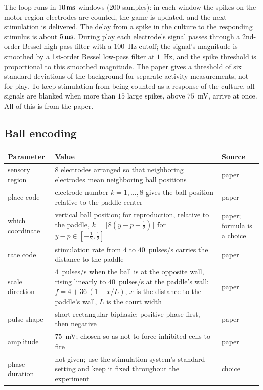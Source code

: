 The loop runs in $10\,\text{ms}$ windows ($200$ samples): in each window the spikes on the motor-region electrodes are counted, the game is updated, and the next stimulation is delivered. The delay from a spike in the culture to the responding stimulus is about $5\,\text{ms}$. During play each electrode's signal passes through a 2nd-order Bessel high-pass filter with a $100$~Hz cutoff; the signal's magnitude is smoothed by a 1st-order Bessel low-pass filter at $1$~Hz, and the spike threshold is proportional to this smoothed magnitude. The paper gives a threshold of six standard deviations of the background for separate activity measurements, not for play. To keep stimulation from being counted as a response of the culture, all signals are blanked when more than $15$ large spikes, above $75$~mV, arrive at once. All of this is from the paper.

\subsection*{Ball encoding}

\begin{center}
\footnotesize
\setlength{\tabcolsep}{4pt}
\renewcommand{\arraystretch}{1.15}
\begin{tabular}{>{\raggedright}p{3.4cm}>{\raggedright}p{7.5cm}>{\raggedright\arraybackslash}p{1.6cm}}
\toprule
Parameter & Value & Source \\
\midrule
sensory region & $8$ electrodes arranged so that neighboring electrodes mean neighboring ball positions & paper \\
place code & electrode number $k=1,\dots,8$ gives the ball position relative to the paddle center & paper \\
which coordinate & vertical ball position; for reproduction, relative to the paddle, $k=\lceil 8(y-p+\tfrac12)\rceil$ for $y-p\in[-\tfrac12,\tfrac12]$ & paper; formula is a choice \\
rate code & stimulation rate from $4$ to $40$~pulses/s carries the distance to the paddle & paper \\
scale direction & $4$~pulses/s when the ball is at the opposite wall, rising linearly to $40$~pulses/s at the paddle's wall: $f=4+36\,(1-x/L)$, $x$ is the distance to the paddle's wall, $L$ is the court width & paper \\
pulse shape & short rectangular biphasic: positive phase first, then negative & paper \\
amplitude & $75$~mV; chosen so as not to force inhibited cells to fire & paper \\
phase duration & not given; use the stimulation system's standard setting and keep it fixed throughout the experiment & choice \\
\bottomrule
\end{tabular}
\end{center}

